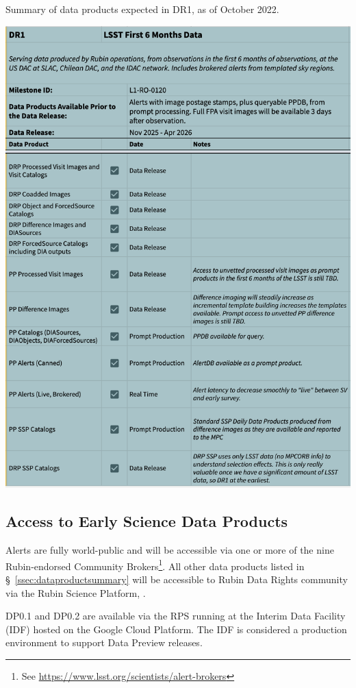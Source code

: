 \begin{table}
\caption{Summary of data products expected in DR1, as of October 2022.}
\label{tab:dr-one-products}
\includegraphics[width=\linewidth]{figures/DR1-products}
\end{table}


\subsection{Access to Early Science  Data Products} \label{ssec:dataaccess}
Alerts are fully world-public and will be accessible via one or more of the nine Rubin-endorsed Community Brokers\footnote{See \url{https://www.lsst.org/scientists/alert-brokers}}.
All other data products listed in \S~\ref{ssec:dataproductsummary} will be accessible to Rubin Data Rights community via the Rubin Science Platform, \citep{LSE-319}.

DP0.1 and DP0.2 are available via the RPS running at the Interim Data Facility (IDF) hosted on the Google Cloud Platform.
The IDF is considered a production environment to support Data Preview releases. 

